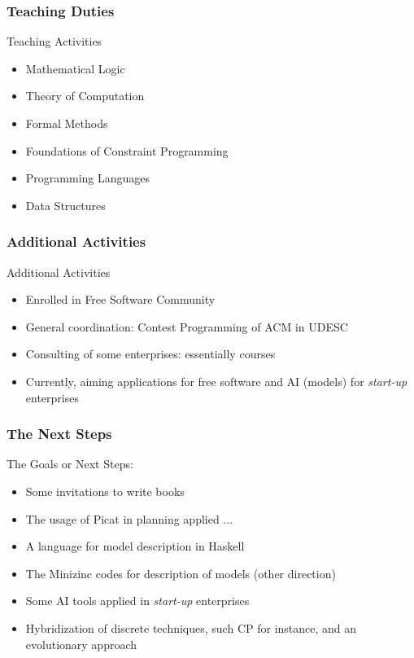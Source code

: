 \documentclass{beamer}
\begin{document}
\subsubsection{Teaching Duties}
\begin{frame}{Teaching Activities}

\begin{itemize}
  \item Mathematical Logic
  \item Theory of Computation
  \item Formal Methods
  \item Foundations of Constraint Programming
  \item Programming Languages
   \item Data Structures
\end{itemize}
\end{frame}

\subsubsection{Additional Activities}
\begin{frame}{Additional Activities}

\begin{itemize}
  \item Enrolled in Free Software Community
  \item General coordination: Contest Programming of ACM in UDESC
  \item Consulting of some enterprises: essentially courses
  \item Currently, aiming applications for free software and AI (models) for  {\em start-up} enterprises
\end{itemize}
\end{frame}


\subsubsection{The Next Steps}
\begin{frame}{The Goals or Next Steps:}
\label{next_steps}
\begin{itemize}
  \item Some invitations to write books 
  \item The usage of Picat in planning applied  ...
  \item A language for model description  in Haskell 
  \item The Minizinc codes for description of models (other direction)
  \item Some AI tools applied in  {\em start-up} enterprises
  \item Hybridization of discrete techniques, such CP for instance, 
    and an evolutionary approach
\end{itemize}
\end{frame}


\end{document}
